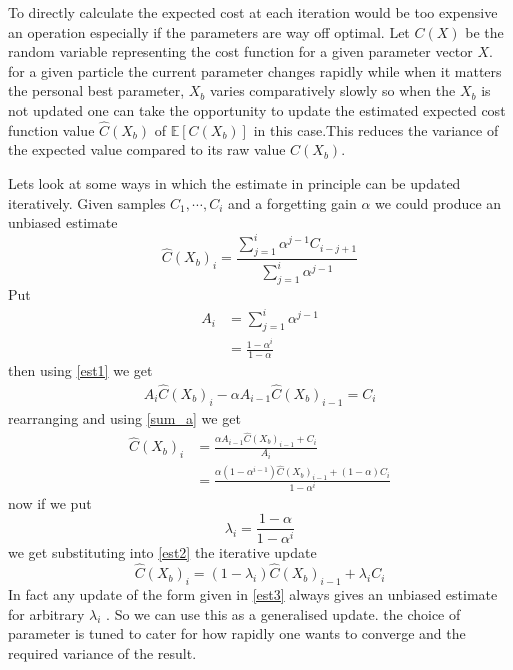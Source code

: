 \documentclass[a4paper,oneside,english]{article}
\numberwithin{equation}{section}
\numberwithin{figure}{section}
\begin{document}
To directly calculate the expected cost at each iteration would be too expensive an operation especially if the parameters are way off optimal. Let $C(X)$ be the random variable representing the cost function for a given parameter vector $X$. for a given particle the current parameter changes rapidly while when it matters the personal best parameter, $X_b$ varies comparatively slowly so  when the $X_b$ is not updated one can take the opportunity to update the estimated expected cost function value $\hat{C}(X_b)$ of $\mathbb{E}[C(X_b)]$ in this case.This reduces the variance of the expected value compared to its raw value $C(X_b)$. 

Lets look at some ways in which the estimate in principle can be updated iteratively. Given samples $C_1,\cdots,C_i$ and a forgetting gain $\alpha$ we could produce an unbiased estimate
\begin{equation}
\label{est1}
\hat{C}(X_b)_i=\frac{\sum_{j=1}^i\alpha^{j-1}C_{i-j+1}}{\sum_{j=1}^i\alpha^{j-1}}
\end{equation}
Put 
\begin{align}
A_i&=\sum_{j=1}^i\alpha^{j-1}\\
\label{sum_a}
&=\frac{1-\alpha^i}{1-\alpha}
\end{align}
then using \eqref{est1} we get
\begin{align}
A_{i}\hat{C}(X_b)_{i}-\alpha A_{i-1}\hat{C}(X_b)_{i-1}=C_i
\end{align}
rearranging and using \eqref{sum_a} we get
\begin{align}
\hat{C}(X_b)_{i}&=\frac{\alpha A_{i-1}\hat{C}(X_b)_{i-1}+C_i}{A_{i}}\\
\label{est2}
&=\frac{\alpha(1-\alpha^{i-1})\hat{C}(X_b)_{i-1}+(1-\alpha)C_i}
{1-\alpha^{i}}
\end{align}
now if we put 
\begin{equation}\label{lam1}
\lambda_i=\frac{1-\alpha}{1-\alpha^{i}}
\end{equation}
we get substituting into \eqref{est2} the iterative update
\begin{equation}\label{est3}
\hat{C}(X_b)_{i}=(1-\lambda_i)\hat{C}(X_b)_{i-1}+\lambda_i C_i
\end{equation}
In fact any update of the form given in \eqref{est3} always gives an unbiased estimate  for arbitrary $\lambda_i$ . So we can use this as a generalised update. the choice of parameter is tuned to cater for how rapidly one wants to converge and the required variance of the result.
\end{document}
